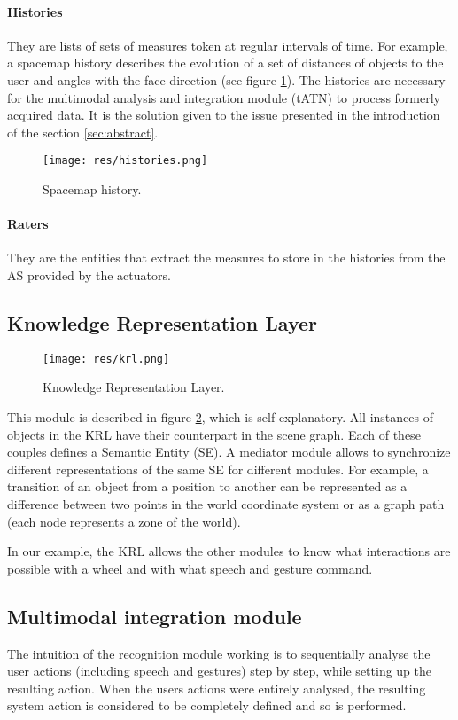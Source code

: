 \documentclass[a4paper]{article}
\begin{document}
\paragraph{Histories} They are lists of sets of measures token at regular intervals of time. For example, a spacemap history describes the evolution of a set of distances of objects to the user and angles with the face direction (see figure \ref{fig:histories}). The histories are necessary for the multimodal analysis and integration module (tATN) to process formerly acquired data. It is the solution given to the issue presented in the introduction of the section \ref{sec:abstract}. 

\begin{figure}[!h]
\centering
\texttt{[image: res/histories.png]}
\caption{\label{fig:histories}Spacemap history.}
\end{figure}

\paragraph{Raters} They are the entities that extract the measures to store in the histories from the AS provided by the actuators.

\subsection{Knowledge Representation Layer}

\begin{figure}
\centering
\texttt{[image: res/krl.png]}
\caption{\label{fig:krl}Knowledge Representation Layer.}
\end{figure}

This module is described in figure \ref{fig:krl}, which is self-explanatory. All instances of objects in the KRL have their counterpart in the scene graph. Each of these couples defines a Semantic Entity (SE). A mediator module allows to synchronize different representations of the same SE for different modules. For example, a transition of an object from a position to another can be represented as a difference between two points in the world coordinate system or as a graph path (each node represents a zone of the world).

In our example, the KRL allows the other modules to know what interactions are possible with a wheel and with what speech and gesture command.

\subsection{Multimodal integration module}
\label{subsec:recognition}
The intuition of the recognition module working is to sequentially analyse the user actions (including speech and gestures) step by step, while setting up the resulting action. When the users actions were entirely analysed, the resulting system action is considered to be completely defined and so is performed.
\end{document}
